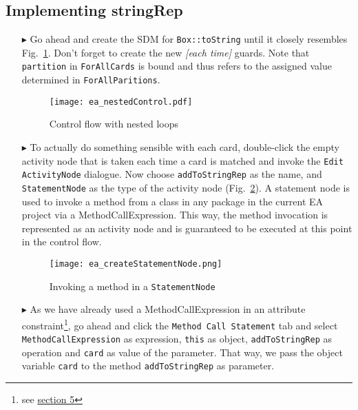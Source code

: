 \newpage
\subsection{Implementing stringRep}
\visHeader
\hypertarget{stringRep vis}{}

\begin{itemize}

\item[$\blacktriangleright$] Go ahead and create the SDM for \texttt{Box::toString} until it closely resembles Fig.~\ref{fig:sdm_tostring_1}. Don't forget to
create the new \emph{[each time]} guards. Note that \texttt{partition} in \texttt{ForAllCards} is bound  and thus refers to the assigned value determined in
\texttt{ForAllParitions}.

\begin{figure}[htbp]
\begin{center}
  \texttt{[image: ea\_nestedControl.pdf]}
  \caption{Control flow with nested loops} 
  \label{fig:sdm_tostring_1}
\end{center}
\end{figure}


\item[$\blacktriangleright$] To actually do something sensible with each card, double-click the empty activity node that is taken each time a card is matched and invoke the \texttt{Edit
ActivityNode} dialogue. Now choose \texttt{addToStringRep} as the name, and \texttt{StatementNode} as the type of the activity node
(Fig.~\ref{fig:sdm_tostring_2}).  A statement node is used to invoke a method from a class in any package in the current EA project via a
MethodCallExpression. This way, the method invocation is represented as an activity node and is guaranteed to be executed at this point in the control flow.

\begin{figure}[htbp]
\begin{center}
  \texttt{[image: ea\_createStatementNode.png]}
  \caption{Invoking a method in a \texttt{StatementNode}}  
  \label{fig:sdm_tostring_2}
\end{center}
\end{figure}

\item[$\blacktriangleright$] As we have already used a MethodCallExpression in an attribute constraint\footnote{see \hyperlink{sec:growBox}{section 5}}, go
ahead and click the \texttt{Method Call Statement} tab and select \texttt{MethodCallExpression} as expression, \texttt{this} as object, \texttt{addToStringRep} as
operation and \texttt{card} as value of the parameter. That way, we pass the object variable \texttt{card} to the method \texttt{addToStringRep} as parameter.

\end{itemize}

